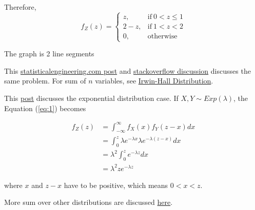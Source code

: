 \documentclass[12pt]{simple_doc}
\begin{document}
    Therefore,
    \begin{equation}
        f_Z(z) =
            \begin{cases}
              z, & \text{if}\ 0 < z \leqslant 1\\
              2 - z, & \text{if}\ 1 < z < 2\\
              0, & \text{otherwise}
            \end{cases}
    \end{equation}

    The graph is 2 line segments

    \begin{center}
    \end{center}


    This \href{http://www.statisticalengineering.com/sums_of_random_variables.htm}{statisticalengineering.com post}
    and \href{https://math.stackexchange.com/questions/357672/density-of-sum-of-two-independent-uniform-random-variables-on-0-1}{stackoverflow discussion}
    discusses the same problem. For sum of $n$ variables, see
    \href{https://en.wikipedia.org/wiki/Irwin%E2%80%93Hall_distribution}{ Irwin-Hall Distribution}.

    This \href{https://towardsdatascience.com/sum-of-exponential-random-variables-b023b61f0c0f}{post}
    discusses the exponential distribution case. If $X, Y \sim Exp(\lambda)$, the Equation (\ref{eq:1})
    becomes

    \begin{equation} \label{eq:2}
		\begin{aligned}
		f_Z(z) &= \int_{-\infty}^{\infty} f_X(x)f_Y(z-x)dx\\
               &= \int_{0}^{z} \lambda e^{-\lambda x} \lambda e^{-\lambda (z - x)} dx\\
               &= \lambda^2 \int_{0}^{z} e^{-\lambda z} dx\\
               &= \lambda^2 z e^{-\lambda z}
		\end{aligned}
	\end{equation}

    where $x$ and $z-x$ have to be positive, which means $0 < x < z$.

    More sum over other distributions are discussed
    \href{http://www.dim.uchile.cl/~mkiwi/ma34a/libro/ch7.pdf}{here}.
\end{document}
